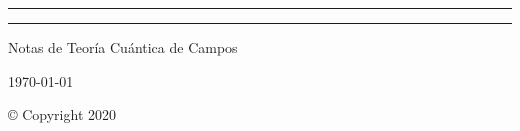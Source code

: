 
\thispagestyle{empty}
\begin{titlepage}
	\centering
	\vspace{10cm}
	\rule{\textwidth}{1.5pt} 
		{\huge\bfseries		\titulo 	\par}
	\rule{\textwidth}{1.5pt}
	\par
	\vspace{5cm}	
		{\huge Notas de Teoría Cuántica de Campos \par}
	\vspace{4cm}
		{\huge	\autor \par}
	\vspace{4cm}
		{\Large	\today \par}
	\vspace{3cm}
		{\Large \copyright{} Copyright  2020  \autor}

	\end{titlepage}

